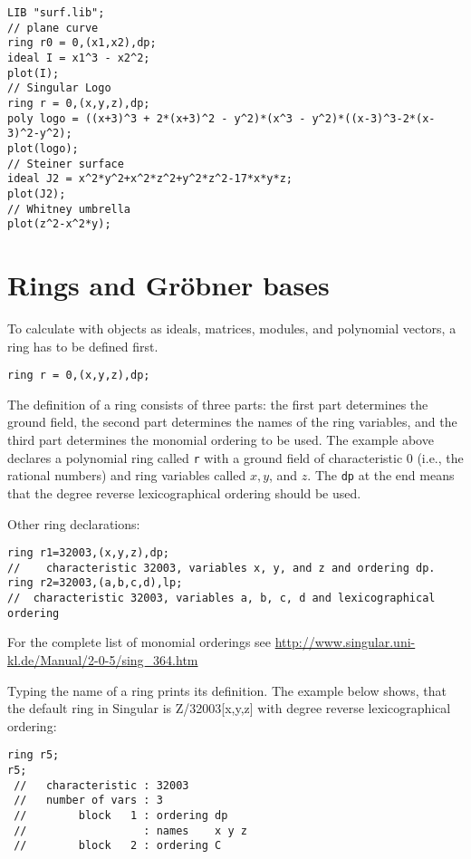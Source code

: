 \documentclass[12pt]{amsart}
\begin{document}
\begin{verbatim}
LIB "surf.lib";
// plane curve
ring r0 = 0,(x1,x2),dp;
ideal I = x1^3 - x2^2;
plot(I); 
// Singular Logo 
ring r = 0,(x,y,z),dp;
poly logo = ((x+3)^3 + 2*(x+3)^2 - y^2)*(x^3 - y^2)*((x-3)^3-2*(x-3)^2-y^2);
plot(logo);
// Steiner surface
ideal J2 = x^2*y^2+x^2*z^2+y^2*z^2-17*x*y*z;
plot(J2);
// Whitney umbrella
plot(z^2-x^2*y);
\end{verbatim}

\section{Rings and Gr\"obner bases}

To calculate with objects as ideals, matrices, modules, and polynomial vectors, a ring has to be defined first.

\begin{verbatim}
ring r = 0,(x,y,z),dp;
\end{verbatim}

The definition of a ring consists of three parts: the first part determines the ground field, 
the second part determines the names of the ring variables, and the third part determines the monomial ordering to be used. 
The example above declares a polynomial ring called \texttt{r} with a ground field of characteristic 0 
(i.e., the rational numbers) and ring variables called $x, y$, and $z$. The \texttt{dp} at the end means that the 
degree reverse lexicographical ordering should be used.

Other ring declarations:

\begin{verbatim}
ring r1=32003,(x,y,z),dp;
//    characteristic 32003, variables x, y, and z and ordering dp. 
ring r2=32003,(a,b,c,d),lp;
//  characteristic 32003, variables a, b, c, d and lexicographical ordering
\end{verbatim}

For the complete list of monomial orderings see \url{http://www.singular.uni-kl.de/Manual/2-0-5/sing_364.htm}

Typing the name of a ring prints its definition. The example below shows, that the default ring in 
Singular is Z/32003[x,y,z] with degree reverse lexicographical ordering:

\begin{verbatim}
ring r5;
r5;
 //   characteristic : 32003
 //   number of vars : 3
 //        block   1 : ordering dp
 //                  : names    x y z 
 //        block   2 : ordering C
\end{verbatim}
\end{document}
